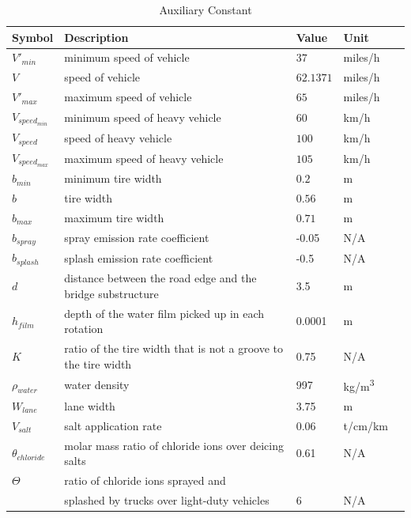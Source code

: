 \documentclass[12pt]{article}
\begin{document}
\begin{table}[!h]

  \renewcommand{\arraystretch}{1.2}
\noindent \begin{longtable*}{l l l l c} 
  \toprule
 \textbf{Symbol} & \textbf{Description} & \textbf{Value} & \textbf{Unit}\\


  \midrule 
  $V'_{min}$ & minimum speed of vehicle & $37$ & miles/h  
  \\
  $V$ &  speed of vehicle & $62.1371$ & miles/h   
  \\
  $V'_{max}$ & maximum speed of vehicle & $65$ & miles/h   
  \\
  $V_{speed_{min}}$ & minimum speed of heavy vehicle & $60$ & km/h   
  \\
  $V_{speed}$ & speed of heavy vehicle & $100$ & km/h   
  \\
  $V_{speed_{max}}$ & maximum speed of heavy vehicle & $105$ & km/h
  \\
  $b_{min}$ & minimum tire width & $0.2$ & m 
  \\
  $b$ & tire width & $0.56$ & m 
  \\
  $b_{max}$ & maximum tire width & $0.71$ & m 
  \\ 
  $b_{spray}$ & spray emission rate coefficient & -0.05 & N/A
  \\
  $b_{splash}$ & splash emission rate coefficient & -0.5 & N/A
  \\
  $d$ & distance between the road edge and the bridge substructure & 3.5 & m
  \\
  $h_{film}$ & depth of the water film picked up in each rotation & 0.0001 & m
  \\
  $K$ & ratio of the tire width that is not a groove to the tire width & 0.75& N/A
  \\
  $\rho_{water}$ & water density & 997 & \si{kg/m^3}
  \\  
  $W_{lane}$ & lane width & 3.75 & m
  \\  
  $V_{salt}$ & salt application rate & 0.06 & t/cm/km
  \\
  $\theta_{chloride}$ &  molar mass ratio of chloride ions over deicing salts & 0.61 & N/A \\
  $\Theta$ & ratio of chloride ions sprayed and  \\
  & splashed by trucks over light-duty vehicles& 6 & N/A

  \\  
  
  \bottomrule
\end{longtable*}
  \caption{Auxiliary Constant} \label{TblConstants}
\end{table}
\end{document}
